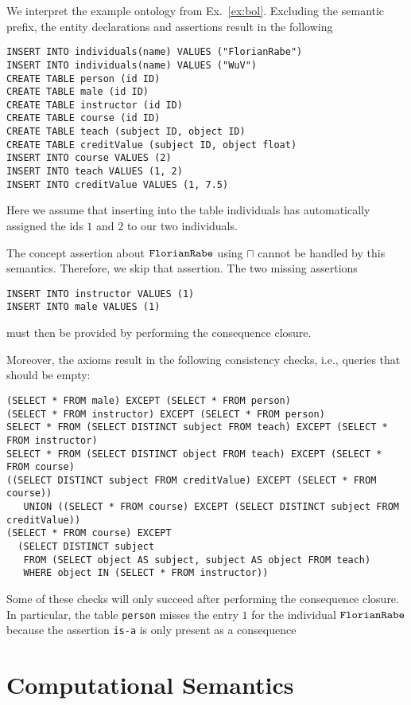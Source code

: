 \begin{example}
We interpret the example ontology from Ex.~\ref{ex:bol}.
Excluding the semantic prefix, the entity declarations and assertions result in the following
\begin{lstlisting}
INSERT INTO individuals(name) VALUES ("FlorianRabe")
INSERT INTO individuals(name) VALUES ("WuV")
CREATE TABLE person (id ID)
CREATE TABLE male (id ID)
CREATE TABLE instructor (id ID)
CREATE TABLE course (id ID)
CREATE TABLE teach (subject ID, object ID)
CREATE TABLE creditValue (subject ID, object float)
INSERT INTO course VALUES (2)
INSERT INTO teach VALUES (1, 2)
INSERT INTO creditValue VALUES (1, 7.5)
\end{lstlisting}

Here we assume that inserting into the table individuals has automatically assigned the ids $1$ and $2$ to our two individuals.

The concept assertion about $\mathtt{FlorianRabe}$ using $\sqcap$ cannot be handled by this semantics.
Therefore, we skip that assertion.
The two missing assertions
\begin{lstlisting}
INSERT INTO instructor VALUES (1)
INSERT INTO male VALUES (1)
\end{lstlisting}
must then be provided by performing the consequence closure.

Moreover, the axioms result in the following consistency checks, i.e., queries that should be empty:
\begin{lstlisting}
(SELECT * FROM male) EXCEPT (SELECT * FROM person)
(SELECT * FROM instructor) EXCEPT (SELECT * FROM person)
SELECT * FROM (SELECT DISTINCT subject FROM teach) EXCEPT (SELECT * FROM instructor)
SELECT * FROM (SELECT DISTINCT object FROM teach) EXCEPT (SELECT * FROM course)
((SELECT DISTINCT subject FROM creditValue) EXCEPT (SELECT * FROM course))
   UNION ((SELECT * FROM course) EXCEPT (SELECT DISTINCT subject FROM creditValue))
(SELECT * FROM course) EXCEPT
  (SELECT DISTINCT subject
   FROM (SELECT object AS subject, subject AS object FROM teach)
   WHERE object IN (SELECT * FROM instructor))
\end{lstlisting}
Some of these checks will only succeed after performing the consequence closure.
In particular, the table \verb|person| misses the entry $1$ for the individual $\mathtt{FlorianRabe}$ because the assertion {\FR\;\texttt{is-a}\;\person} is only present as a consequence
\end{example}

\section{Computational Semantics}\label{sec:bolsem:comp}


